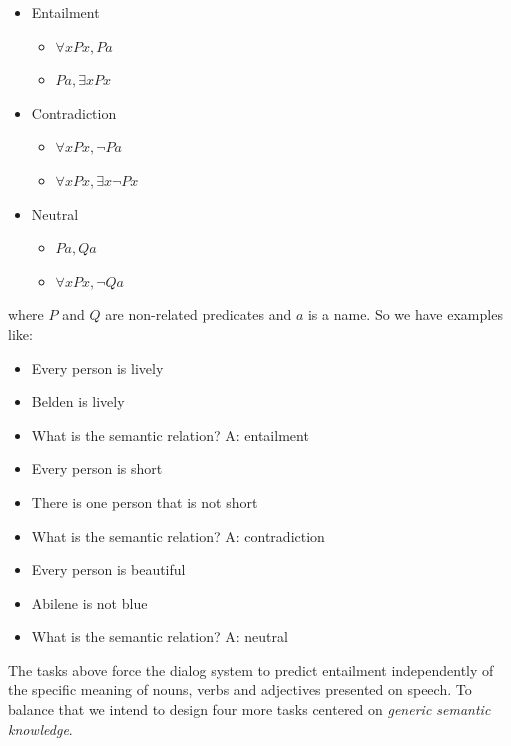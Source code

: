 \begin{itemize}
\item Entailment
\begin{itemize}
\item $\forall x Px, Pa$ 
\item $Pa, \exists x Px$ 
\end{itemize}
\item Contradiction
\begin{itemize}
\item $\forall x Px, \lnot Pa$ 
\item $\forall x Px, \exists x \lnot Px$ 
\end{itemize}
\item Neutral
\begin{itemize}
\item $Pa,Qa$
\item $\forall x Px, \lnot Qa$ 
\end{itemize}
\end{itemize}

where $P$ and $Q$ are non-related predicates and $a$ is a name. So we have examples like:

\begin{itemize} 
\item[] Every person is lively
\item[] Belden is lively
\item[] What is the semantic relation? A: entailment
\end{itemize}

\begin{itemize} 
\item[] Every person is short
\item[] There is one person that is not short
\item[] What is the semantic relation?  A: contradiction
\end{itemize}

\begin{itemize} 
\item[] Every person is beautiful
\item[] Abilene is not blue
\item[] What is the semantic relation? A: neutral
\end{itemize}


The tasks above force the dialog system to predict entailment independently of the specific meaning of nouns, verbs and adjectives presented on speech. To balance that we intend to design four more tasks centered on \textit{generic semantic knowledge}.

